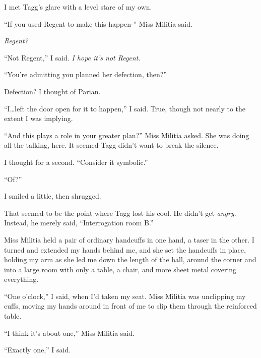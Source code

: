 I met Tagg's glare with a level stare of my own.



``If you used Regent to make this happen-'' Miss Militia said.



\emph{Regent?}



``Not Regent,'' I said.  \emph{I hope it's not Regent}.



``You're admitting you planned her defection, then?''



Defection?  I thought of Parian.



``I\ldots left the door open for it to happen,'' I said.  True, though not nearly to the extent I was implying.



``And this plays a role in your greater plan?'' Miss Militia asked.  She was doing all the talking, here.  It seemed Tagg didn't want to break the silence.



I thought for a second.  ``Consider it symbolic.''



``Of?''



I smiled a little, then shrugged.



That seemed to be the point where Tagg lost his cool.  He didn't get \emph{angry}.  Instead, he merely said, ``Interrogation room B.''



Miss Militia held a pair of ordinary handcuffs in one hand, a taser in the other.  I turned and extended my hands behind me, and she set the handcuffs in place, holding my arm as she led me down the length of the hall, around the corner and into a large room with only a table, a chair, and more sheet metal covering everything.



``One o'clock,'' I said, when I'd taken my seat.  Miss Militia was unclipping my cuffs, moving my hands around in front of me to slip them through the reinforced table.



``I think it's about one,'' Miss Militia said.



``Exactly one,'' I said.



